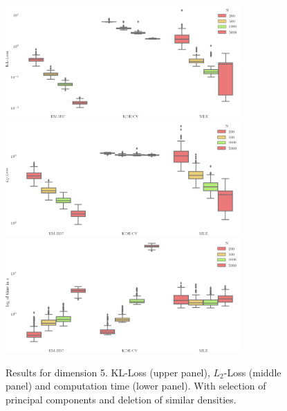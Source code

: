 \begin{figure}
\center
    \includegraphics[width=0.8\textwidth]{./TeX_files/dict_gen_loss_dim_5_KL_gof_pc_select.png}
    \includegraphics[width=0.8\textwidth]{./TeX_files/dict_gen_loss_dim_5_L2_gof_pc_select.png}
    \includegraphics[width=0.8\textwidth]{./TeX_files/dict_gen_time_dim_5_gof_pc_select.png}
    \caption{Results for dimension 5. KL-Loss (upper panel), $L_2$-Loss (middle panel) and computation time (lower panel). With selection of principal components and deletion of similar densities.}
    \label{fig:result_dict_gen_dim_5_gof_pc_select}
\end{figure}

